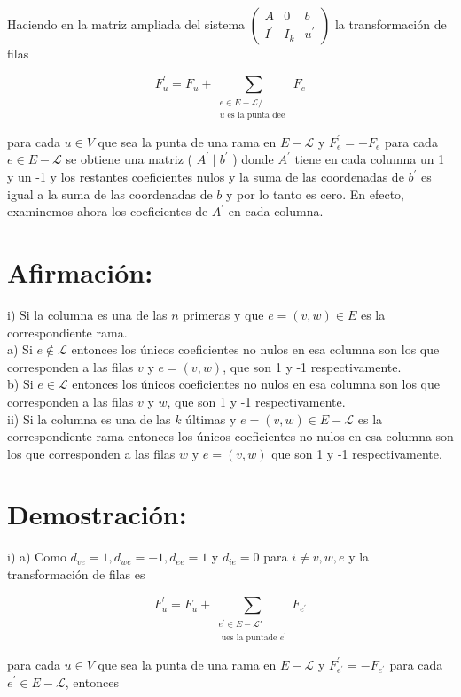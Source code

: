 \documentclass[10pt]{article}
\begin{document}
Haciendo en la matriz ampliada del sistema $\left(\begin{array}{cc|c}A & 0 & b \\ I^{\prime} & I_{k} & u^{\prime}\end{array}\right)$ la transformación de filas

$$
F_{u}^{\prime}=F_{u}+\sum_{\substack{e \in E-\mathcal{L} / \\ u \text { es la punta dee }}} F_{e}
$$

para cada $u \in V$ que sea la punta de una rama en $E-\mathcal{L}$ y $F_{e}^{\prime}=-F_{e}$ para cada $e \in E-\mathcal{L}$ se obtiene una matriz ( $A^{\prime} \mid b^{\prime}$ ) donde $A^{\prime}$ tiene en cada columna un 1 y un -1 y los restantes coeficientes nulos y la suma de las coordenadas de $b^{\prime}$ es igual a la suma de las coordenadas de $b$ y por lo tanto es cero. En efecto, examinemos ahora los coeficientes de $A^{\prime}$ en cada columna.

\section*{Afirmación:}
i) Si la columna es una de las $n$ primeras y que $e=(v, w) \in E$ es la correspondiente rama.\\
a) Si $e \notin \mathcal{L}$ entonces los únicos coeficientes no nulos en esa columna son los que corresponden a las filas $v$ y $e=(v, w)$, que son 1 y -1 respectivamente.\\
b) Si $e \in \mathcal{L}$ entonces los únicos coeficientes no nulos en esa columna son los que corresponden a las filas $v$ y $w$, que son 1 y -1 respectivamente.\\
ii) Si la columna es una de las $k$ últimas y $e=(v, w) \in E-\mathcal{L}$ es la correspondiente rama entonces los únicos coeficientes no nulos en esa columna son los que corresponden a las filas $w$ y $e=(v, w)$ que son 1 y -1 respectivamente.

\section*{Demostración:}
i) a) Como $d_{v e}=1, d_{w e}=-1, d_{e e}=1$ y $d_{i e}=0$ para $i \neq v, w, e$ y la transformación de filas es

$$
F_{u}^{\prime}=F_{u}+\sum_{\substack{e^{\prime} \in E-\mathcal{L} \prime \\ \text { ues la puntade } e^{\prime}}} F_{e^{\prime}}
$$

para cada $u \in V$ que sea la punta de una rama en $E-\mathcal{L}$ y $F_{e^{\prime}}^{\prime}=-F_{e^{\prime}}$ para cada $e^{\prime} \in E-\mathcal{L}$, entonces
\end{document}
